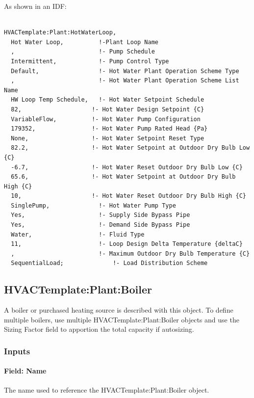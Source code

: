 As shown in an IDF:

\begin{lstlisting}

HVACTemplate:Plant:HotWaterLoop,
  Hot Water Loop,          !-Plant Loop Name
  ,                        !- Pump Schedule
  Intermittent,            !- Pump Control Type
  Default,                 !- Hot Water Plant Operation Scheme Type
  ,                        !- Hot Water Plant Operation Scheme List Name
  HW Loop Temp Schedule,   !- Hot Water Setpoint Schedule
  82,                    !- Hot Water Design Setpoint {C}
  VariableFlow,          !- Hot Water Pump Configuration
  179352,                !- Hot Water Pump Rated Head {Pa}
  None,                  !- Hot Water Setpoint Reset Type
  82.2,                  !- Hot Water Setpoint at Outdoor Dry Bulb Low {C}
  -6.7,                  !- Hot Water Reset Outdoor Dry Bulb Low {C}
  65.6,                  !- Hot Water Setpoint at Outdoor Dry Bulb High {C}
  10,                    !- Hot Water Reset Outdoor Dry Bulb High {C}
  SinglePump,              !- Hot Water Pump Type
  Yes,                     !- Supply Side Bypass Pipe
  Yes,                     !- Demand Side Bypass Pipe
  Water,                   !- Fluid Type
  11,                      !- Loop Design Delta Temperature {deltaC}
  ,                        !- Maximum Outdoor Dry Bulb Temperature {C}
  SequentialLoad;              !- Load Distribution Scheme
\end{lstlisting}

\subsection{HVACTemplate:Plant:Boiler}\label{hvactemplateplantboiler}

A boiler or purchased heating source is described with this object. To define multiple boilers, use multiple HVACTemplate:Plant:Boiler objects and use the Sizing Factor field to apportion the total capacity if autosizing.

\subsubsection{Inputs}\label{inputs-29-000}

\paragraph{Field: Name}\label{field-name-16-003}

The name used to reference the HVACTemplate:Plant:Boiler object.

